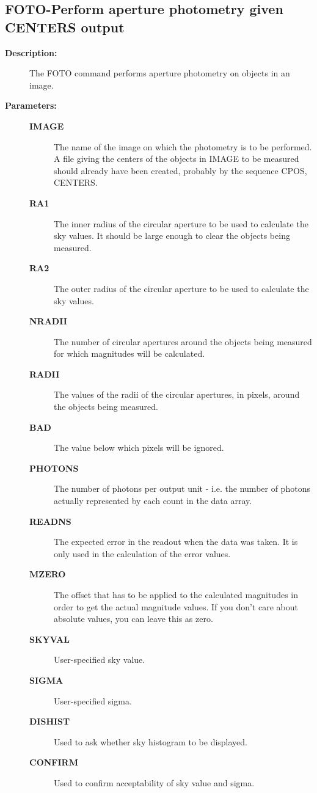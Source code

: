 \subsection{FOTO-\label{FOTO}Perform aperture photometry given CENTERS output}
\begin{description}

\item [{\bf Description:}]
 The FOTO command performs aperture photometry on objects
 in an image.

\item [{\bf Parameters:}]
\begin{description}
\item [{\bf IMAGE}]
 The name of the image on which the photometry is to be
 performed.  A file giving the centers of the objects in
 IMAGE to be measured should already have been created,
 probably by the sequence CPOS, CENTERS.
\item [{\bf RA1}]
 The inner radius of the circular aperture to be used to
 calculate the sky values.  It should be large enough to
 clear the objects being measured.
\item [{\bf RA2}]
 The outer radius of the circular aperture to be used to
 calculate the sky values.
\item [{\bf NRADII}]
 The number of circular apertures around the objects being
 measured for which magnitudes will be calculated.
\item [{\bf RADII}]
 The values of the radii of the circular apertures, in
 pixels, around the objects being measured.
\item [{\bf BAD}]
 The value below which pixels will be ignored.
\item [{\bf PHOTONS}]
 The number of photons per output unit - i.e. the number of
 photons actually represented by each count in the data array.
\item [{\bf READNS}]
 The expected error in the readout when the data was taken.
 It is only used in the calculation of the error values.
\item [{\bf MZERO}]
 The offset that has to be applied to the calculated
 magnitudes in order to get the actual magnitude values.
 If you don't care about absolute values, you can leave
 this as zero.
\item [{\bf SKYVAL}]
 User-specified sky value.
\item [{\bf SIGMA}]
 User-specified sigma.
\item [{\bf DISHIST}]
 Used to ask whether sky histogram to be displayed.
\item [{\bf CONFIRM}]
 Used to confirm acceptability of sky value and sigma.
\end{description}


\end{description}
